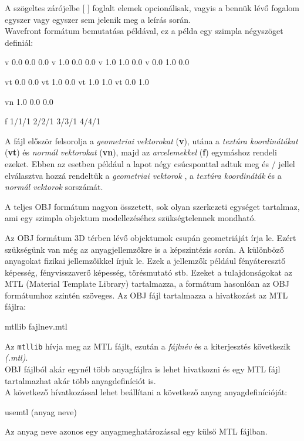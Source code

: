 \noindent A szögeltes zárójelbe [  ] foglalt elemek opcionálisak, vagyis a bennük lévő fogalom egyszer vagy egyszer sem jelenik meg a leírás során. \\

Wavefront formátum bemutatása példával, ez a példa egy szimpla négyszöget definiál:
\bigskip
\begin{python} 
v 0.0 0.0 0.0
v 1.0 0.0 0.0
v 1.0 1.0 0.0
v 0.0 1.0 0.0

vt 0.0 0.0
vt 1.0 0.0
vt 1.0 1.0
vt 0.0 1.0

vn 1.0 0.0 0.0 

f 1/1/1 2/2/1 3/3/1 4/4/1
\end{python}
\bigskip
A fájl először felsorolja a \textsl{geometriai vektorokat} (\textbf{v}), utána a \textsl{textúra koordinátákat} (\textbf{vt}) és \textsl{normál vektorokat} (\textbf{vn}), majd az \textsl{arcelemekkel} (\textbf{f}) egymáshoz rendeli ezeket. Ebben az esetben például a lapot négy csúcsponttal adtuk meg és {/} jellel elválasztva hozzá rendeltük a  \textsl{geometriai vektorok} , a \textsl{textúra koordináták} és a \textsl{normál vektorok} sorszámát.

A teljes OBJ formátum nagyon összetett, sok olyan szerkezeti egységet tartalmaz, ami egy szimpla objektum modellezéséhez szükségtelennek mondható.


Az OBJ formátum 3D térben lévő objektumok csupán geometriáját írja le. Ezért szükségünk van még az anyagjellemzőkre is a képszintézis során. A különböző anyagokat fizikai jellemzőikkel írjuk le. Ezek a jellemzők például fényáteresztő képesség, fényvisszaverő képesség, törésmutató stb.\cite{diane1995mtl}\newpage
Ezeket a tulajdonságokat az MTL (Material Template Library) tartalmazza, a formátum hasonlóan az OBJ formátumhoz szintén szöveges. Az OBJ fájl tartalmazza a hivatkozást az {MTL} fájlra:
\bigskip
\begin{python}
mtllib fajlnev.mtl
\end{python}
\bigskip
Az \texttt{mtllib} hívja meg az MTL fájlt, ezután a \textsl{fájlnév} és a kiterjesztés következik \textsl{(.mtl)}.\\
OBJ fájlból akár egynél több anyagfájlra is lehet hivatkozni és egy MTL fájl tartalmazhat akár több anyagdefiníciót is.\\

\noindent A következő hívatkozással lehet beállítani a következő anyag anyagdefinícióját:
\bigskip
\begin{python}
usemtl (anyag neve)
\end{python}
\bigskip
Az anyag neve azonos egy anyagmeghatározással egy külső MTL fájlban.\\

